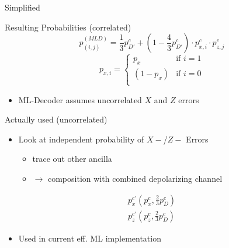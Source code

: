 \documentclass{beamer}
\begin{document}
\begin{frame}{Simplified}
    \begin{block}{Resulting Probabilities (correlated)}
        \begin{equation*}
            p_{(i,j)}^{(MLD)} = \frac{1}{3}p_{D'}^c + (1- \frac{4}{3}p_{D'}^c)\cdot p_{x,i}^c \cdot p_{z,j}^c
        \end{equation*}
        \vspace{0.5cm}
        \begin{equation*}
            p_{x,i} = 
            \begin{cases}
                p_x & \text{if } i=1  \\
                (1-p_x) & \text{if } i=0\\
            \end{cases}
        \end{equation*}
    \end{block}
    \begin{itemize}
        \item ML-Decoder assumes uncorrelated $X$ and $Z$ errors
    \end{itemize}
\end{frame}

\begin{frame}{Actually used (uncorrelated)}
    \begin{itemize}
        \item Look at independent probability of $X-$/$Z-$ Errors
        \begin{itemize}
            \item trace out other ancilla 
            \item $\rightarrow$ composition with combined depolarizing channel
        \end{itemize}
    \end{itemize}
    \begin{align*}
        p^{c'}_x \left(p^{c}_x, \frac{2}{3}p^{c}_D\right)  \\
        p^{c'}_z \left(p^{c}_z, \frac{2}{3}p^{c}_D\right) 
    \end{align*}
    \begin{itemize}
        \item Used in current eff. ML implementation 
    \end{itemize}
\end{frame}
\end{document}
